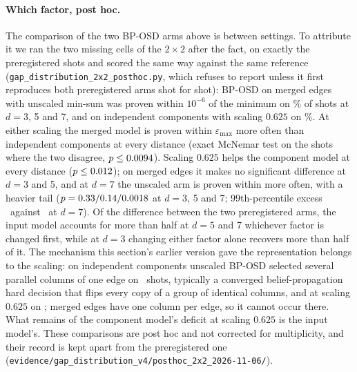 \documentclass[aps,pra,twocolumn,superscriptaddress,nofootinbib,longbibliography,floatfix]{revtex4-2}
\newcommand{\eps}{\varepsilon}
\begin{document}
\paragraph*{Which factor, post hoc.} The comparison of the two BP-OSD arms above is between settings. To attribute it we ran the two missing cells of the $2\times2$ after the fact, on exactly the preregistered shots and scored the same way against the same reference (\nolinkurl{gap_distribution_2x2_posthoc.py}, which refuses to report unless it first reproduces both preregistered arms shot for shot): BP-OSD on merged edges with unscaled min-sum was proven within $10^{-6}$ of the minimum on \GapTwoMergedUnscaledEpsOptPct\% of shots at $d=3$, 5 and 7, and on independent components with scaling $0.625$ on \GapTwoComponentScaledEpsOptPct\%. At either scaling the merged model is proven within $\eps_{\max}$ more often than independent components at every distance (exact McNemar test on the shots where the two disagree, $p\le0.0094$). Scaling $0.625$ helps the component model at every distance ($p\le0.012$); on merged edges it makes no significant difference at $d=3$ and 5, and at $d=7$ the unscaled arm is proven within more often, with a heavier tail ($p=0.33 / 0.14 / 0.0018$ at $d=3$, 5 and 7; 99th-percentile excess \GapTwoMergedUnscaledPNinetyNineDSeven\ against \GapMergedPNinetyNineDSeven\ at $d=7$). Of the difference between the two preregistered arms, the input model accounts for more than half at $d=5$ and 7 whichever factor is changed first, while at $d=3$ changing either factor alone recovers more than half of it. The mechanism this section's earlier version gave the representation belongs to the scaling: on independent components unscaled BP-OSD selected several parallel columns of one edge on \GapComponentCancelled\ shots, typically a converged belief-propagation hard decision that flips every copy of a group of identical columns, and at scaling $0.625$ on \GapTwoComponentScaledCancelled; merged edges have one column per edge, so it cannot occur there. What remains of the component model's deficit at scaling $0.625$ is the input model's. These comparisons are post hoc and not corrected for multiplicity, and their record is kept apart from the preregistered one (\nolinkurl{evidence/gap_distribution_v4/posthoc_2x2_2026-11-06/}).
\end{document}
